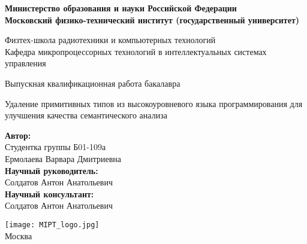 \begin{center}
    \large\textbf{Министерство образования и науки Российской Федерации \\
    Московский физико-технический институт (государственный
    университет)} \\
    \vspace{1cm}

    Физтех-школа радиотехники и компьютерных технологий \\

    Кафедра микропроцессорных технологий в интеллектуальных системах управления \\

    \vspace{3em}

    Выпускная квалификационная работа бакалавра
\end{center}

\begin{center}
    \vspace{\fill}
    \LARGE{Удаление примитивных типов из высокоуровневого языка программирования для улучшения качества семантического анализа}

    \vspace{\fill}
\end{center}


\begin{flushright}
    \textbf{Автор:} \\
    Студентка группы Б01-109а \\
    Ермолаева Варвара Дмитриевна \\
    \vspace{2em}
    \textbf{Научный руководитель:} \\
    Солдатов Антон Анатольевич \\
    \vspace{2em}
    \textbf{Научный консультант:} \\
    Солдатов Антон Анатольевич \\
\end{flushright}

\vspace{7em}

\begin{center}
    \texttt{[image: MIPT\_logo.jpg]}\\
    Москва \the\year{}
\end{center}

\thispagestyle{empty}

\newpage
\setcounter{page}{2}
\fancyfoot[c]{\thepage}
\fancyhead[R]{}